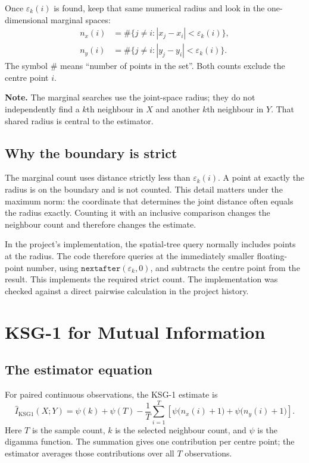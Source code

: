 \documentclass[11pt,letterpaper,oneside]{report}
\newcommand{\epsk}{\varepsilon_k}
\newcommand{\Note}[1]{\par\noindent\colorbox{notegray}{\parbox{0.965\linewidth}{\textbf{Note.} #1}}\par}
\begin{document}
Once $\epsk(i)$ is found, keep that same numerical radius and look in the one-dimensional marginal spaces:
\begin{align}
  n_x(i) &= \#\{j\ne i: |x_j-x_i|<\epsk(i)\},\\
  n_y(i) &= \#\{j\ne i: |y_j-y_i|<\epsk(i)\}.
\end{align}
The symbol $\#$ means “number of points in the set”. Both counts exclude the centre point $i$.

\Note{The marginal searches use the joint-space radius; they do not independently find a $k$th neighbour in $X$ and another $k$th neighbour in $Y$. That shared radius is central to the estimator.}

\subsection{Why the boundary is strict}

The marginal count uses distance strictly less than $\epsk(i)$. A point at exactly the radius is on the boundary and is not counted. This detail matters under the maximum norm: the coordinate that determines the joint distance often equals the radius exactly. Counting it with an inclusive comparison changes the neighbour count and therefore changes the estimate.

In the project's implementation, the spatial-tree query normally includes points at the radius. The code therefore queries at the immediately smaller floating-point number, using $\texttt{nextafter}(\epsk,0)$, and subtracts the centre point from the result. This implements the required strict count. The implementation was checked against a direct pairwise calculation in the project history.

\section{KSG-1 for Mutual Information}

\subsection{The estimator equation}

For paired continuous observations, the KSG-1 estimate is
\begin{equation}
  \widehat I_{\mathrm{KSG1}}(X;Y)
  = \psi(k)+\psi(T)
  -\frac{1}{T}\sum_{i=1}^{T}
    \left[\psi\bigl(n_x(i)+1\bigr)+\psi\bigl(n_y(i)+1\bigr)\right].
  \label{eq:ksg1}
\end{equation}
Here $T$ is the sample count, $k$ is the selected neighbour count, and $\psi$ is the digamma function. The summation gives one contribution per centre point; the estimator averages those contributions over all $T$ observations.
\end{document}
